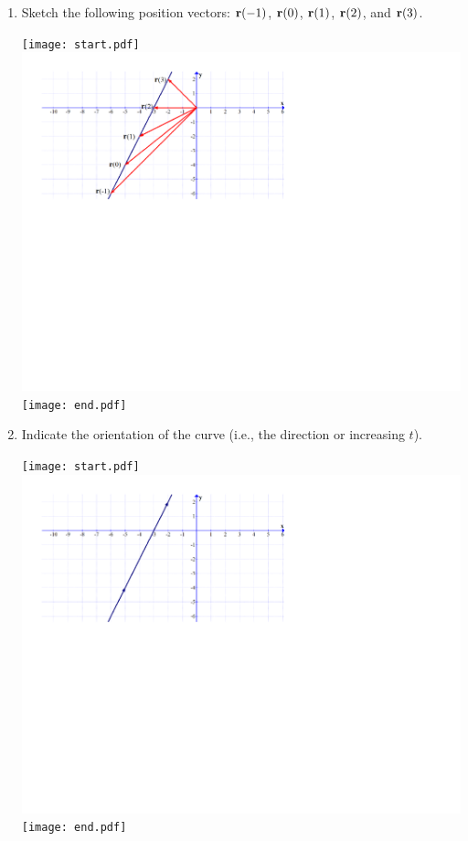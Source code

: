 \documentclass[12pt]{article}
\begin{document}
\begin{enumerate}
\begin{enumerate}

\item Sketch the following position vectors: ${\bf r}(-1)$, ${\bf r}(0)$, ${\bf r}(1)$, ${\bf r}(2)$,  and ${\bf r}(3)$. 

\texttt{[image: start.pdf]}
{{\includegraphics[scale=0.4]{line_a.pdf}}}
\texttt{[image: end.pdf]}


\item Indicate the orientation of the curve (i.e., the direction or increasing $t$).

\texttt{[image: start.pdf]}
{{\includegraphics[scale=0.4]{line_b.pdf}}}
\texttt{[image: end.pdf]}



\end{enumerate}
\end{enumerate}
\end{document}

